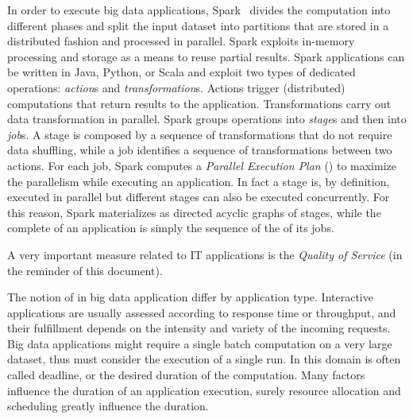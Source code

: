 In order to execute big data applications, Spark~\cite{Zaharia2010} divides the computation into different phases and split the input dataset into partitions that are stored in a distributed fashion and processed in parallel. Spark exploits in-memory processing and storage as a means to reuse partial results. Spark applications can be written in Java, Python, or Scala and exploit two types of dedicated operations: \textit{action}s and  \textit{transformation}s. Actions trigger (distributed) computations that return results to the application. Transformations carry out data transformation in parallel. Spark groups operations into \textit{stage}s and then into \textit{job}s. A stage is composed by a sequence of transformations that do not require data shuffling, while a job identifies a sequence of transformations between two actions. For each job, Spark computes a \textit{Parallel Execution Plan} (\plan) to maximize the parallelism while executing an application. In fact a stage is, by definition, executed in parallel but different stages can also be executed concurrently. For this reason, Spark materializes \plans as directed acyclic graphs of stages, while the complete \plan of an application is simply the sequence of the \plans of its jobs. 


A very important measure related to IT applications is the \textit{Quality of Service} (\qos in the reminder of this document).

The notion of \qos in big data application differ by application type. Interactive applications are usually assessed according to response time or throughput, and their fulfillment depends on the intensity and variety of the incoming requests. Big data applications might require a single batch computation on a very large dataset, thus \qos must consider the execution of a single run. In this domain \qos is often called deadline, or the desired duration of the computation. Many factors influence the duration of an application execution, surely resource allocation and scheduling greatly influence the duration. 

